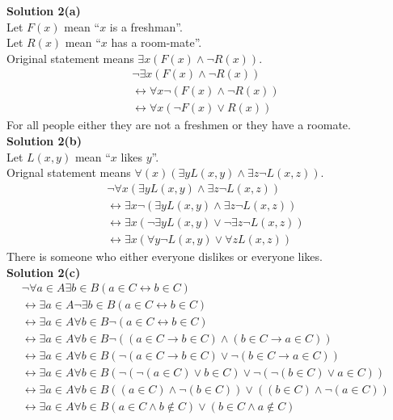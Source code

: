 \textbf{Solution 2(a)} \\
Let $F(x)$ mean ``$x$ is a freshman''. \\
Let $R(x)$ mean ``$x$ has a room-mate''. \\
Original statement means $\exists{x}(F(x) \wedge \neg R(x))$.
\begin{align*}
    & \neg \exists{x}(F(x) \wedge \neg R(x)) && \\
    &\leftrightarrow \forall{x}\neg(F(x) \wedge \neg R(x)) && \\
    &\leftrightarrow \forall{x}(\neg F(x) \vee R(x))
\end{align*}
For all people either they are not a freshmen or they have a roomate. \\
\textbf{Solution 2(b)} \\
Let $L(x, y)$ mean ``$x$ likes $y$''. \\
Orignal statement means $\forall(x)(\exists{y}L(x, y) \wedge \exists{z} \neg L(x, z))$.
\begin{align*}
    & \neg \forall x(\exists{y}L(x, y) \wedge \exists{z} \neg L(x, z)) && \\
    & \leftrightarrow \exists x\neg(\exists{y}L(x, y) \wedge \exists{z} \neg L(x, z)) && \\
    & \leftrightarrow \exists x(\neg\exists{y}L(x, y) \vee \neg\exists{z} \neg L(x, z)) && \\
    & \leftrightarrow \exists x(\forall{y}\neg L(x, y) \vee \forall{z} L(x, z))
\end{align*}
There is someone who either everyone dislikes or everyone likes. \\
\textbf{Solution 2(c)} \\
\begin{align*}
    & \neg \forall{a \in A} \exists{b \in B} (a \in C \leftrightarrow b \in C) && \\
    & \leftrightarrow \exists{a \in A} \neg \exists{b \in B} (a \in C \leftrightarrow b \in C) && \\
    & \leftrightarrow \exists{a \in A} \forall{b \in B} \neg (a \in C \leftrightarrow b \in C) && \\
    & \leftrightarrow \exists{a \in A} \forall{b \in B} 
        \neg ((a \in C \rightarrow b \in C) \wedge (b \in C \rightarrow a \in C)) && \\
    & \leftrightarrow \exists{a \in A} \forall{b \in B} 
        (\neg(a \in C \rightarrow b \in C) \vee \neg(b \in C \rightarrow a \in C)) && \\
    & \leftrightarrow \exists{a \in A} \forall{b \in B} 
        (\neg(\neg(a \in C) \vee b \in C) \vee \neg(\neg(b \in C) \vee a \in C)) && \\
    & \leftrightarrow \exists{a \in A} \forall{b \in B} 
        ((a \in C) \wedge \neg(b \in C)) \vee ((b \in C) \wedge \neg(a \in C)) && \\
    & \leftrightarrow \exists{a \in A} \forall{b \in B} 
        (a \in C \wedge b \not \in C) \vee (b \in C \wedge a \not \in C) 
\end{align*}
